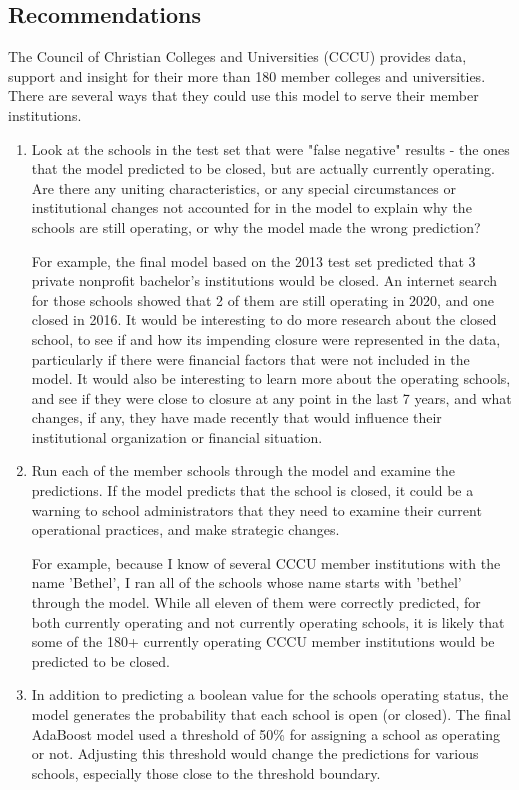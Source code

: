 \documentclass[11pt, letterpaper]{article}
\begin{document}
\subsection{Recommendations}
The Council of Christian Colleges and Universities (CCCU) provides data, support and insight for their more than 180 member colleges and universities. There are several ways that they could use this model to serve their member institutions.

\begin{enumerate}

\item Look at the schools in the test set that were "false negative" results - the ones that the model predicted to be closed, but are actually currently operating. Are there any uniting characteristics, or any special circumstances or institutional changes not accounted for in the model to explain why the schools are still operating, or why the model made the wrong prediction?

For example, the final model based on the 2013 test set predicted that 3 private nonprofit bachelor's institutions would be closed. An internet search for those schools showed that 2 of them are still operating in 2020, and one closed in 2016. It would be interesting to do more research about the closed school, to see if and how its impending closure were represented in the data, particularly if there were financial factors that were not included in the model. It would also be interesting to learn more about the operating schools, and see if they were close to closure at any point in the last 7 years, and what changes, if any, they have made recently that would influence their institutional organization or financial situation.

\item Run each of the member schools through the model and examine the predictions. If the model predicts that the school is closed, it could be a warning to school administrators that they need to examine their current operational practices, and make strategic changes.

For example, because I know of several CCCU member institutions with the name 'Bethel', I ran all of the schools whose name starts with 'bethel' through the model. While all eleven of them were correctly predicted, for both currently operating and not currently operating schools, it is likely that some of the 180+ currently operating CCCU member institutions would be predicted to be closed.

\item In addition to predicting a boolean value for the schools operating status, the model generates the probability that each school is open (or closed). The final AdaBoost model used a threshold of 50\% for assigning a school as operating or not. Adjusting this threshold would change the predictions for various schools, especially those close to the threshold boundary. 


\end{enumerate}
\end{document}

